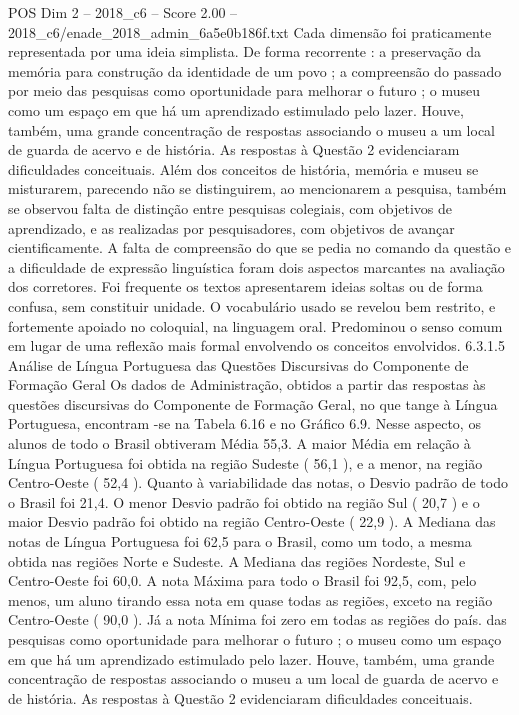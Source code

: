 \begin{textsample}{POS Dim 2 – 2018\_c6 – Score 2.00 – 2018\_c6/enade\_2018\_admin\_6a5e0b186f.txt}
Cada dimensão foi praticamente representada por uma ideia simplista.
De forma recorrente : a preservação da memória para construção da identidade de um povo ; a compreensão do passado por meio das pesquisas como oportunidade para melhorar o futuro ; o museu como um espaço em que há um aprendizado estimulado pelo lazer.
Houve, também, uma grande concentração de respostas associando o museu a um local de guarda de acervo e de história.
As respostas à Questão 2 evidenciaram dificuldades conceituais.
Além dos conceitos de história, memória e museu se misturarem, parecendo não se distinguirem, ao mencionarem a pesquisa, também se observou falta de distinção entre pesquisas colegiais, com objetivos de aprendizado, e as realizadas por pesquisadores, com objetivos de avançar cientificamente.
A falta de compreensão do que se pedia no comando da questão e a dificuldade de expressão linguística foram dois aspectos marcantes na avaliação dos corretores.
Foi frequente os textos apresentarem ideias soltas ou de forma confusa, sem constituir unidade.
O vocabulário usado se revelou bem restrito, e fortemente apoiado no coloquial, na linguagem oral.
Predominou o senso comum em lugar de uma reflexão mais formal envolvendo os conceitos envolvidos. 6.3.1.5 Análise de Língua Portuguesa das Questões Discursivas do Componente de Formação Geral Os dados de Administração, obtidos a partir das respostas às questões discursivas do Componente de Formação Geral, no que tange à Língua Portuguesa, encontram -se na Tabela 6.16 e no Gráfico 6.9.
Nesse aspecto, os alunos de todo o Brasil obtiveram Média 55,3.
A maior Média em relação à Língua Portuguesa foi obtida na região Sudeste ( 56,1 ), e a menor, na região Centro-Oeste ( 52,4 ).
Quanto à variabilidade das notas, o Desvio padrão de todo o Brasil foi 21,4.
O menor Desvio padrão foi obtido na região Sul ( 20,7 ) e o maior Desvio padrão foi obtido na região Centro-Oeste ( 22,9 ).
A Mediana das notas de Língua Portuguesa foi 62,5 para o Brasil, como um todo, a mesma obtida nas regiões Norte e Sudeste.
A Mediana das regiões Nordeste, Sul e Centro-Oeste foi 60,0.
A nota Máxima para todo o Brasil foi 92,5, com, pelo menos, um aluno tirando essa nota em quase todas as regiões, exceto na região Centro-Oeste ( 90,0 ).
Já a nota Mínima foi zero em todas as regiões do país. das pesquisas como oportunidade para melhorar o futuro ; o museu como um espaço em que há um aprendizado estimulado pelo lazer.
Houve, também, uma grande concentração de respostas associando o museu a um local de guarda de acervo e de história.
As respostas à Questão 2 evidenciaram dificuldades conceituais.

\end{textsample}
